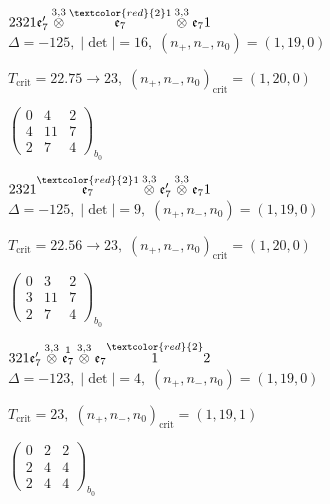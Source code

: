 \documentclass[10pt]{article}
\begin{document}
\smallskip

$2321\mathfrak{e}_7'\overset{3,3}{\otimes}\overset{\textcolor{red}{2}1}{\mathfrak{e}_7}\overset{3,3}{\otimes}\mathfrak{e}_71$ \quad $\Delta=-125,\; |\det|=16,\; (n_+,n_-,n_0)=(1,19,0)$

\hspace{1em}$T_{\text{crit}}=22.75 \to 23,\; (n_+,n_-,n_0)_{\text{crit}}=(1,20,0)$

\hspace{2em}$\left(\begin{smallmatrix}0 & 4 & 2 \\ 4 & 11 & 7 \\ 2 & 7 & 4\end{smallmatrix}\right)_{\!b_0}$

\smallskip

$2321\overset{\textcolor{red}{2}1}{\mathfrak{e}_7}\overset{3,3}{\otimes}\mathfrak{e}_7'\overset{3,3}{\otimes}\mathfrak{e}_71$ \quad $\Delta=-125,\; |\det|=9,\; (n_+,n_-,n_0)=(1,19,0)$

\hspace{1em}$T_{\text{crit}}=22.56 \to 23,\; (n_+,n_-,n_0)_{\text{crit}}=(1,20,0)$

\hspace{2em}$\left(\begin{smallmatrix}0 & 3 & 2 \\ 3 & 11 & 7 \\ 2 & 7 & 4\end{smallmatrix}\right)_{\!b_0}$

\smallskip

$321\mathfrak{e}_7'\overset{3,3}{\otimes}\overset{1}{\mathfrak{e}_7}\overset{3,3}{\otimes}\mathfrak{e}_7\overset{\textcolor{red}{2}}{1}2$ \quad $\Delta=-123,\; |\det|=4,\; (n_+,n_-,n_0)=(1,19,0)$

\hspace{1em}$T_{\text{crit}}=23,\; (n_+,n_-,n_0)_{\text{crit}}=(1,19,1)$

\hspace{2em}$\left(\begin{smallmatrix}0 & 2 & 2 \\ 2 & 4 & 4 \\ 2 & 4 & 4\end{smallmatrix}\right)_{\!b_0}$
\end{document}
